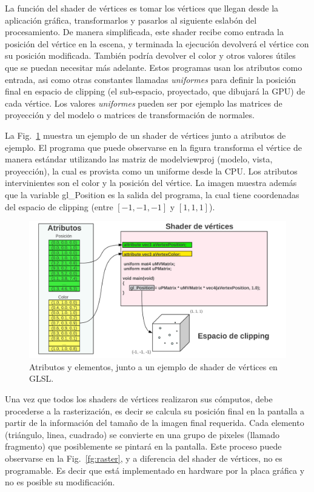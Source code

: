 La funci\'on del shader de vértices es tomar los v\'ertices que llegan desde la aplicaci\'on gr\'afica, transformarlos y pasarlos al siguiente eslab\'on del procesamiento.
De manera simplificada, este shader recibe como entrada la posici\'on del v\'ertice en la escena, y terminada la ejecuci\'on devolver\'a el v\'ertice con su posici\'on modificada.
Tambi\'en podr\'ia devolver el color y otros valores \'utiles que se puedan necesitar m\'as adelante.
Estos programas usan los atributos como entrada, asi como otras constantes llamadas \emph{uniformes} para definir la posición final en espacio de clipping (el sub-espacio, proyectado, que dibujará la GPU) de cada vértice.
Los valores \emph{uniformes} pueden ser por ejemplo las matrices de proyección y del modelo o matrices de transformación de normales. 

La Fig.~\ref{fg:vertexshader} muestra un ejemplo de un shader de vértices junto a atributos de ejemplo.
El programa que puede observarse en la figura transforma el vértice de manera estándar utilizando las matriz de modelviewproj (modelo, vista, proyección), la cual es provista como un uniforme desde la CPU.
Los atributos intervinientes son el color y la posición del vértice.
La imagen muestra además que la variable gl\_Position es la salida del programa, la cual tiene coordenadas del espacio de clipping (entre $[-1,-1,-1]$ y $[1,1,1]$).

\begin{figure}[h]
\begin{center}
\includegraphics[width=13cm]{figures/vertexshader}
\end{center}
\caption{Atributos y elementos, junto a un ejemplo de shader de vértices en GLSL.}
\label{fg:vertexshader}
\end{figure}

Una vez que todos los shaders de vértices realizaron sus cómputos, debe procederse a la rasterización, es decir se calcula su posición final en la pantalla a partir de la información del tamaño de la imagen final requerida.
Cada elemento (triángulo, linea, cuadrado) se convierte en una grupo de pixeles (llamado fragmento) que posiblemente se pintará en la pantalla.
Este proceso puede observarse en la Fig.~\ref{fg:raster}, y a diferencia del shader de vértices, no es programable.
Es decir que está implementado en hardware por la placa gráfica y no es posible su modificación.


